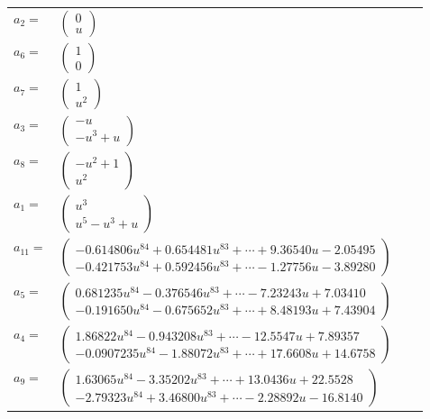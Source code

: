 \documentclass[1p]{elsarticle_modified}
\theoremstyle{definition}
\begin{document}
\begin{tabular}{m{7pt} m{180pt} m{7pt} m{180pt} }
\flushright $a_{2}=$&$\begin{pmatrix}0\\u\end{pmatrix}$ \\
\flushright $a_{6}=$&$\begin{pmatrix}1\\0\end{pmatrix}$ \\
\flushright $a_{7}=$&$\begin{pmatrix}1\\u^2\end{pmatrix}$ \\
\flushright $a_{3}=$&$\begin{pmatrix}- u\\- u^3+u\end{pmatrix}$ \\
\flushright $a_{8}=$&$\begin{pmatrix}- u^2+1\\u^2\end{pmatrix}$ \\
\flushright $a_{1}=$&$\begin{pmatrix}u^3\\u^5- u^3+u\end{pmatrix}$ \\
\flushright $a_{11}=$&$\begin{pmatrix}-0.614806 u^{84}+0.654481 u^{83}+\cdots+9.36540 u-2.05495\\-0.421753 u^{84}+0.592456 u^{83}+\cdots-1.27756 u-3.89280\end{pmatrix}$ \\
\flushright $a_{5}=$&$\begin{pmatrix}0.681235 u^{84}-0.376546 u^{83}+\cdots-7.23243 u+7.03410\\-0.191650 u^{84}-0.675652 u^{83}+\cdots+8.48193 u+7.43904\end{pmatrix}$ \\
\flushright $a_{4}=$&$\begin{pmatrix}1.86822 u^{84}-0.943208 u^{83}+\cdots-12.5547 u+7.89357\\-0.0907235 u^{84}-1.88072 u^{83}+\cdots+17.6608 u+14.6758\end{pmatrix}$ \\
\flushright $a_{9}=$&$\begin{pmatrix}1.63065 u^{84}-3.35202 u^{83}+\cdots+13.0436 u+22.5528\\-2.79323 u^{84}+3.46800 u^{83}+\cdots-2.28892 u-16.8140\end{pmatrix}$ \\

\end{tabular}
\end{document}
